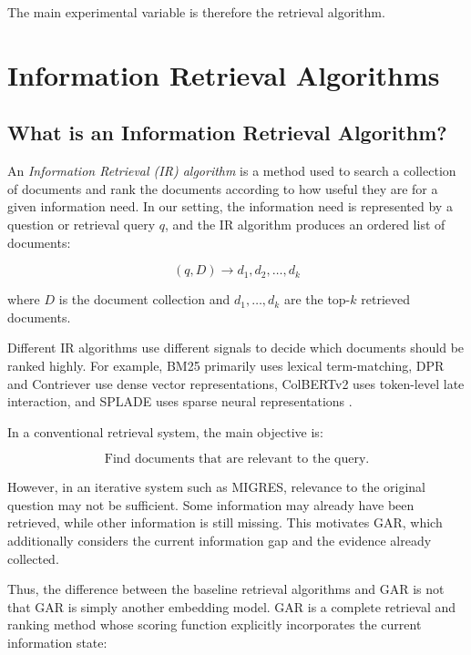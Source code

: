 \documentclass[11pt,a4paper]{article}
\begin{document}
The main experimental variable is therefore the retrieval algorithm.

\section{Information Retrieval Algorithms}

\subsection{What is an Information Retrieval Algorithm?}

An \textit{Information Retrieval (IR) algorithm} is a method used to
search a collection of documents and rank the documents according to how
useful they are for a given information need. In our setting, the
information need is represented by a question or retrieval query $q$, and
the IR algorithm produces an ordered list of documents:

\[
\boxed{
(q,D)
\rightarrow
d_1,d_2,\ldots,d_k
}
\]

where $D$ is the document collection and $d_1,\ldots,d_k$ are the top-$k$
retrieved documents.

Different IR algorithms use different signals to decide which documents
should be ranked highly. For example, BM25 primarily uses lexical
term-matching, DPR and Contriever use dense vector representations,
ColBERTv2 uses token-level late interaction, and SPLADE uses sparse neural
representations \citep{robertson-zaragoza-2009,karpukhin-etal-2020-dense,
izacard-grave-2021-contriever,santhanam-etal-2022-colbertv2,
formal-etal-2021-splade}.

In a conventional retrieval system, the main objective is:

\[
\boxed{
\text{Find documents that are relevant to the query.}
}
\]

However, in an iterative system such as MIGRES, relevance to the original
question may not be sufficient. Some information may already have been
retrieved, while other information is still missing. This motivates GAR,
which additionally considers the current information gap and the evidence
already collected.

Thus, the difference between the baseline retrieval algorithms and GAR is
not that GAR is simply another embedding model. GAR is a complete retrieval
and ranking method whose scoring function explicitly incorporates the
current information state:
\end{document}
